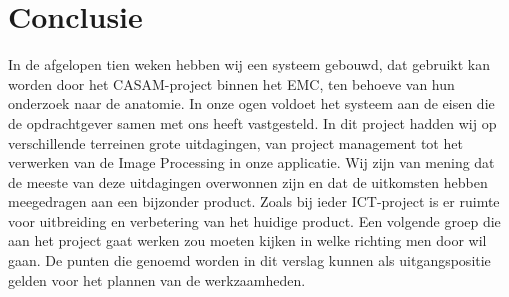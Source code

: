 \chapter{Conclusie}
\label{Conclusie}
In de afgelopen tien weken hebben wij een systeem gebouwd, dat gebruikt kan worden door het CASAM-project binnen het EMC, ten behoeve van hun onderzoek naar de anatomie.
In onze ogen voldoet het systeem aan de eisen die de opdrachtgever samen met ons heeft vastgesteld. 
In dit project hadden wij op verschillende terreinen grote uitdagingen,
van project management tot het verwerken van de Image Processing in onze applicatie.
Wij zijn van mening dat de meeste van deze uitdagingen overwonnen zijn en dat de uitkomsten hebben meegedragen aan een bijzonder product. 
Zoals bij ieder ICT-project is er ruimte voor uitbreiding en verbetering van het huidige product.
Een volgende groep die aan het project gaat werken zou moeten kijken in welke richting men door wil gaan.
De punten die genoemd worden in dit verslag kunnen als uitgangspositie gelden voor het plannen van de werkzaamheden.
